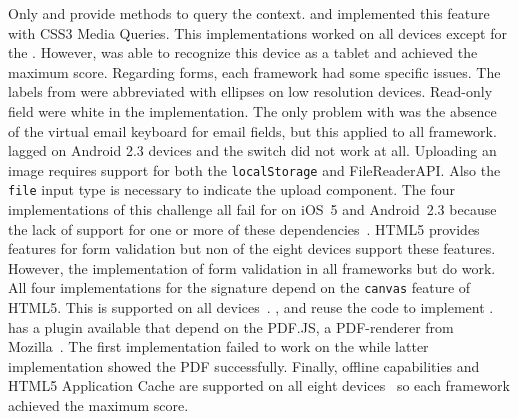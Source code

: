 \documentclass[a4paper]{artikel3}
\newcommand{\code}[1]{\texttt{#1}}
\begin{document}
Only \sta{} and \kendoa{} provide methods to query the context.
\jqma{} and \lungo{} implemented this feature with CSS3 Media Queries.
This implementations worked on all devices except for the \gtab.
However,  \kendoa{} was able to recognize this device as a tablet and achieved the maximum score.
Regarding forms,  each framework had some specific issues.
The labels from \sta{} were abbreviated with ellipses on low resolution devices.
Read-only field were white in the \kendoa{} implementation.
The only problem with \jqma{} was the absence of the virtual email keyboard for email fields,  but this applied to all framework. 
\lungo{} lagged on Android 2.3 devices and the switch did not work at all.
Uploading an image requires support for both the \code{localStorage} and FileReaderAPI.  
Also the \code{file} input type is necessary to indicate the upload component.
The four implementations of this challenge all fail for on iOS~5 and Android~2.3 because the lack of support for one or more of these dependencies~\cite{Deveria2013c,ViljamiSalminen2012}.
HTML5 provides features for form validation but non of the eight devices support these features.
However, the implementation of form validation in all frameworks but \lungo{} do work.
All four implementations for the signature depend on the \code{canvas} feature of HTML5.
This is supported on all devices~\cite{Deveria2013c}.
\kendoa{}, \jqma{} and \lungo{} reuse the code to implement .
\sta{} has a plugin available that depend on the PDF.JS,  a PDF-renderer from Mozilla~\cite{Gal2010}.
The first implementation failed to work on the \gs{} while latter implementation showed the PDF successfully.
Finally, offline capabilities and HTML5 Application Cache are supported on all eight devices~\cite{Deveria2013c} so each framework achieved the maximum score.
\end{document}
